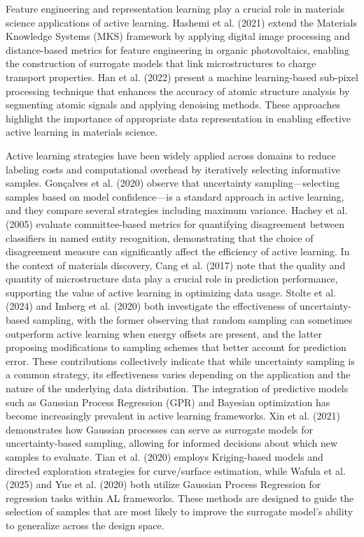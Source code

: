 Feature engineering and representation learning play a crucial role in materials science applications of active learning. Hashemi et al. (2021) extend the Materials Knowledge Systems (MKS) framework by applying digital image processing and distance-based metrics for feature engineering in organic photovoltaics, enabling the construction of surrogate models that link microstructures to charge transport properties. Han et al. (2022) present a machine learning-based sub-pixel processing technique that enhances the accuracy of atomic structure analysis by segmenting atomic signals and applying denoising methods. These approaches highlight the importance of appropriate data representation in enabling effective active learning in materials science.

Active learning strategies have been widely applied across domains to reduce labeling costs and computational overhead by iteratively selecting informative samples. Gonçalves et al. (2020) observe that uncertainty sampling---selecting samples based on model confidence---is a standard approach in active learning, and they compare several strategies including maximum variance. Hachey et al. (2005) evaluate committee-based metrics for quantifying disagreement between classifiers in named entity recognition, demonstrating that the choice of disagreement measure can significantly affect the efficiency of active learning. In the context of materials discovery, Cang et al. (2017) note that the quality and quantity of microstructure data play a crucial role in prediction performance, supporting the value of active learning in optimizing data usage. Stolte et al. (2024) and Imberg et al. (2020) both investigate the effectiveness of uncertainty-based sampling, with the former observing that random sampling can sometimes outperform active learning when energy offsets are present, and the latter proposing modifications to sampling schemes that better account for prediction error. These contributions collectively indicate that while uncertainty sampling is a common strategy, its effectiveness varies depending on the application and the nature of the underlying data distribution. The integration of predictive models such as Gaussian Process Regression (GPR) and Bayesian optimization has become increasingly prevalent in active learning frameworks. Xin et al. (2021) demonstrates how Gaussian processes can serve as surrogate models for uncertainty-based sampling, allowing for informed decisions about which new samples to evaluate. Tian et al. (2020) employs Kriging-based models and directed exploration strategies for curve/surface estimation, while Wafula et al. (2025) and Yue et al. (2020) both utilize Gaussian Process Regression for regression tasks within AL frameworks. These methods are designed to guide the selection of samples that are most likely to improve the surrogate model's ability to generalize across the design space.

